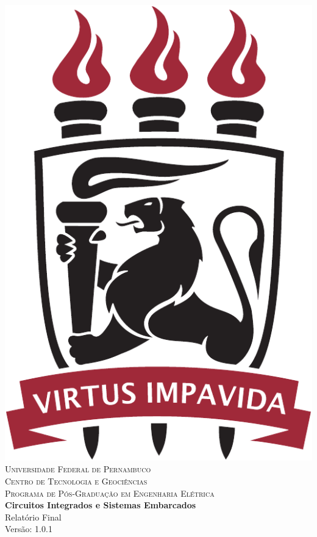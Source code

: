 \documentclass[
	12pt,				%
	openright,			%
  oneside,     %
	a4paper,			%
	english,			%
	french,				%
	spanish,			%
	brazil				%
	]{abntex2}
\begin{document}


\begin{center} 
\includegraphics[scale=0.25]{images/ufpelogo.pdf} \\

{\scshape Universidade Federal de Pernambuco\\}
{\scshape Centro de Tecnologia e Geociências\\}
{\scshape Programa de Pós-Graduação em Engenharia Elétrica\\}
\vfill
        {{\Large \textbf{Circuitos Integrados e Sistemas Embarcados}}}\\
        \vspace{.5cm}
        {{\Large Relatório Final}}\\
        \vspace{1cm}
        {{\large Versão: 1.0.1}}\\
        \vfill


\end{center}
\end{document}
